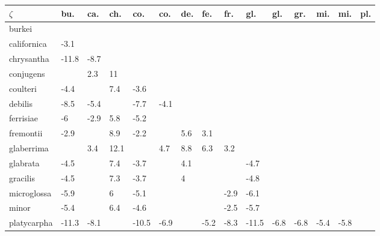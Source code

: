 \begin{table}[ht]
\centering
\begin{tabular}{lllllllllllllll}
  \hline
$\zeta$ & bu. & ca. & ch. & co. & co. & de. & fe. & fr. & gl. & gl. & gr. & mi. & mi. & pl. \\ 
  \hline
burkei &  &  &  &  &  &  &  &  &  &  &  &  &  &  \\ 
  californica & -3.1 &  &  &  &  &  &  &  &  &  &  &  &  &  \\ 
  chrysantha & -11.8 & -8.7 &  &  &  &  &  &  &  &  &  &  &  &  \\ 
  conjugens &  & 2.3 & 11 &  &  &  &  &  &  &  &  &  &  &  \\ 
  coulteri & -4.4 &  & 7.4 & -3.6 &  &  &  &  &  &  &  &  &  &  \\ 
  debilis & -8.5 & -5.4 &  & -7.7 & -4.1 &  &  &  &  &  &  &  &  &  \\ 
  ferrisiae & -6 & -2.9 & 5.8 & -5.2 &  &  &  &  &  &  &  &  &  &  \\ 
  fremontii & -2.9 &  & 8.9 & -2.2 &  & 5.6 & 3.1 &  &  &  &  &  &  &  \\ 
  glaberrima &  & 3.4 & 12.1 &  & 4.7 & 8.8 & 6.3 & 3.2 &  &  &  &  &  &  \\ 
  glabrata & -4.5 &  & 7.4 & -3.7 &  & 4.1 &  &  & -4.7 &  &  &  &  &  \\ 
  gracilis & -4.5 &  & 7.3 & -3.7 &  & 4 &  &  & -4.8 &  &  &  &  &  \\ 
  microglossa & -5.9 &  & 6 & -5.1 &  &  &  & -2.9 & -6.1 &  &  &  &  &  \\ 
  minor & -5.4 &  & 6.4 & -4.6 &  &  &  & -2.5 & -5.7 &  &  &  &  &  \\ 
  platycarpha & -11.3 & -8.1 &  & -10.5 & -6.9 &  & -5.2 & -8.3 & -11.5 & -6.8 & -6.8 & -5.4 & -5.8 &  \\ 
   \hline
\end{tabular}
\end{table}
